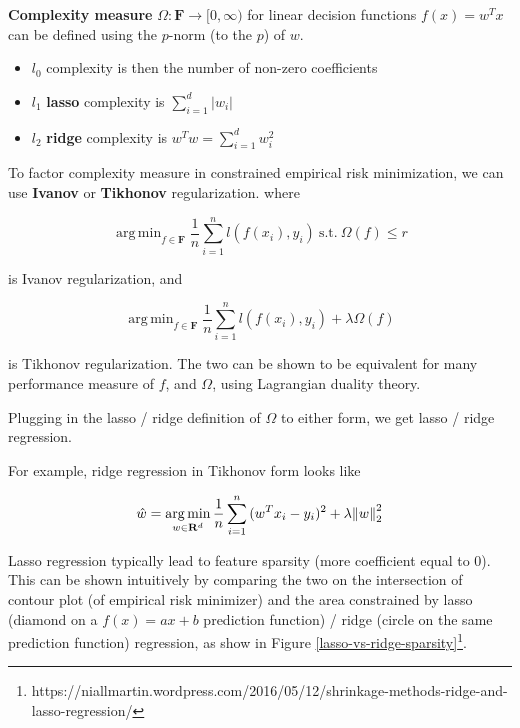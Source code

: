 \documentclass{article}
\DeclareMathOperator*{\argmin}{arg\,min}
\begin{document}
\textbf{Complexity measure} $\Omega : \mathbf{F} \to [0, \infty)$ for linear decision functions $f(x) = w^{T} x$ can be defined using the $p$-norm (to the $p$) of $w$.

\begin{itemize}
  \item $\mathit{l}_0$ complexity is then the number of non-zero coefficients
  \item $\mathit{l}_1$ \textbf{lasso} complexity is $\sum_{i = 1}^{d}{|w_i|}$
  \item $\mathit{l}_2$ \textbf{ridge} complexity is $w^{T} w = \sum_{i = 1}^{d}{w_{i}^{2}}$
\end{itemize}

To factor complexity measure in constrained empirical risk minimization, we can use \textbf{Ivanov} or \textbf{Tikhonov} regularization. where

$$
\argmin_{f \in \mathbf{F}}{\frac{1}{n} \sum_{i = 1}^{n}{\mathit{l}(f(x_i), y_i)}} ~ \text{s.t.} ~ \Omega(f) \leq r
$$

is Ivanov regularization, and

$$
\argmin_{f \in \mathbf{F}}{\frac{1}{n} \sum_{i = 1}^{n}{\mathit{l}(f(x_i), y_i)} + \lambda \Omega(f)}
$$

is Tikhonov regularization.
The two can be shown to be equivalent for many performance measure of $f$, and $\Omega$, using Lagrangian duality theory.

Plugging in the lasso / ridge definition of $\Omega$ to either form, we get lasso / ridge regression.

For example, ridge regression in Tikhonov form looks like

$$
\hat{w} = \argmin_{w \in \mathbf{R}^{d}}{\frac{1}{n} \sum_{i = 1}^{n}{(w^{T} x_i - y_i)^2} + \lambda \norm{w}_2^2}
$$

Lasso regression typically lead to feature sparsity (more coefficient equal to $0$).
This can be shown intuitively by comparing the two on the intersection of contour plot (of empirical risk minimizer) and the area constrained by lasso (diamond on a $f(x) = ax + b$ prediction function) / ridge (circle on the same prediction function) regression, as show in Figure \ref{lasso-vs-ridge-sparsity}\footnote{https://niallmartin.wordpress.com/2016/05/12/shrinkage-methods-ridge-and-lasso-regression/}.

\end{document}
